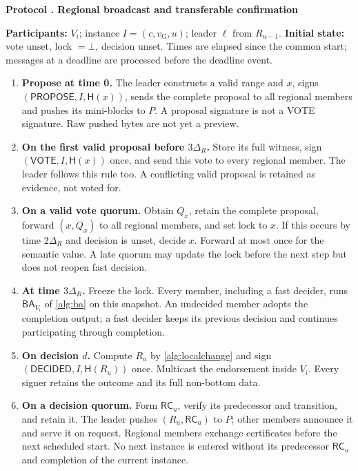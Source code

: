 \documentclass[11pt,a4paper,onecolumn]{article}
\newcommand{\Hash}{\mathsf H}
\newcommand{\RC}{\mathsf{RC}}
\newcommand{\gv}{v_{\mathrm G}}
\newcommand{\BA}{\mathsf{BA}}
\newcommand{\botv}{\bot}
\newcommand{\Tag}[1]{\mathsf{#1}}
\theoremstyle{remark}\newtheorem{example}[definition]{Example}
\newcounter{protocol}
\newenvironment{protocol}[2]{\refstepcounter{protocol}\label{#1}\begin{mdframed}[nobreak=true,linewidth=.6pt,skipabove=10pt,skipbelow=10pt,innertopmargin=8pt,innerbottommargin=8pt]\small\raggedright\noindent\textbf{Protocol \theprotocol. #2}\par\smallskip}{\end{mdframed}}
\begin{document}
\begin{protocol}{alg:regional}{Regional broadcast and transferable confirmation}
\textbf{Participants:} $V_i$; instance $I=(c,\gv,u)$; leader $\ell$ from $R_{u-1}$.
\textbf{Initial state:} vote unset, lock $=\botv$, decision unset.
Times are elapsed since the common start; messages at a deadline are processed
before the deadline event.
\begin{enumerate}[label=\textbf{R\arabic*.}]
\item \textbf{Propose at time 0.} The leader constructs a valid range and
$x$, signs $(\Tag{PROPOSE},I,\Hash(x))$, sends the complete proposal to all
regional members and pushes its mini-blocks to $P$. A proposal signature
is not a VOTE signature. Raw pushed bytes are not yet a preview.
\item \textbf{On the first valid proposal before $3\Delta_R$.} Store its full witness, sign
$(\Tag{VOTE},I,\Hash(x))$ once, and send this vote to every regional member.
The leader follows this rule too. A conflicting valid proposal is retained
as evidence, not voted for.
\item \textbf{On a valid vote quorum.} Obtain $Q_x$, retain the complete
proposal, forward $(x,Q_x)$ to all regional members, and set lock to $x$.
If this occurs by time $2\Delta_R$ and decision is unset, decide $x$.
Forward at most once for the semantic value. A late quorum may update the
lock before the next step but does not reopen fast decision.
\item \textbf{At time $3\Delta_R$.} Freeze the lock. Every member, including
a fast decider, runs $\BA_{V_i}$ of \cref{alg:ba} on this snapshot.
An undecided member adopts the completion output; a fast decider keeps its
previous decision and continues participating through completion.
\item \textbf{On decision $d$.} Compute $R_u$ by \cref{alg:localchange} and
sign $(\Tag{DECIDED},I,\Hash(R_u))$ once. Multicast the endorsement inside
$V_i$. Every signer retains the outcome and its full non-bottom data.
\item \textbf{On a decision quorum.} Form $\RC_u$, verify its predecessor
and transition, and retain it. The leader pushes $(R_u,\RC_u)$ to $P$;
other members announce it and serve it on request. Regional members exchange
certificates before the next scheduled start. No next instance is entered
without its predecessor $\RC_u$ and completion of the current instance.
\end{enumerate}
\end{protocol}
\end{document}
